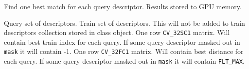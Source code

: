\label{cppfunc.gpu.BruteForceMatcher.matchSingle}
Find one best match for each query descriptor. Results stored to GPU memory.
\begin{description}
 {Query set of descriptors.}
 {Train set of descriptors. This will not be added to train descriptors collection stored in class object.}
 {One row \texttt{CV\_32SC1} matrix. Will contain best train index for each query. If some query descriptor masked out in \texttt{mask} it will contain -1.}
 {One row \texttt{CV\_32FC1} matrix. Will contain best distance for each query. If some query descriptor masked out in \texttt{mask} it will contain \texttt{FLT\_MAX}.}
\end{description}

